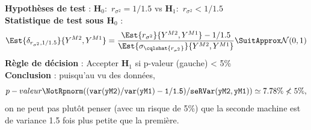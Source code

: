 \documentclass[10pt]{report}
\begin{document}
\begin{exercice}
\begin{Correction}
\noindent \textbf{Hypothèses de test} : $\mathbf{H}_0:$ $r_{\sigma^2}=1/1.5$ vs {\large $\mathbf{H}_1:$ $r_{\sigma^2}<1/1.5$}\\
\textbf{Statistique de test sous $\mathbf{H}_0$} :
  $$
  \Est{\delta_{r_{\sigma^2},1/1.5}}{Y^{M2},Y^{M1}}= {\displaystyle \frac{\Est{r_{\sigma^2}}{Y^{M2},Y^{M1}}-1/1.5}{
\Est{\sigma_{\cqlshat{r_{\sigma^2}}}}{Y^{M2},Y^{M1}}
}} 
  \SuitApprox \mathcal{N}(0,1)
  $$
\textbf{Règle de décision} : Accepter $\mathbf{H}_1$ si 
  p-valeur (gauche) < 5\%\\
\noindent \textbf{Conclusion} :
puisqu'au vu des données, 
  \[
p-valeur\NotR\mathtt{pnorm((var(yM2)/var(yM1)-1/1.5)/seRVar(yM2,yM1))} \simeq 7.78\%\nless5\%,
\]
on ne peut pas plutôt penser (avec un risque de 5\%) que la seconde machine est de variance 1.5 fois plus petite que la premi{\`e}re.
  
\end{Correction}

\end{exercice}
\end{document}

